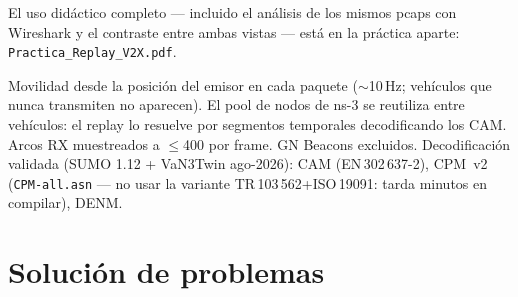 \documentclass[11pt,a4paper]{article}
\begin{document}
\begin{notabox}
El uso didáctico completo --- incluido el análisis de los mismos pcaps con
Wireshark y el contraste entre ambas vistas --- está en la práctica aparte:
\texttt{Practica\_Replay\_V2X.pdf}.
\end{notabox}

\begin{notabox}
Movilidad desde la posición del emisor en cada paquete ($\sim$10\,Hz;
vehículos que nunca transmiten no aparecen). El pool de nodos de ns-3 se
reutiliza entre vehículos: el replay lo resuelve por segmentos temporales
decodificando los CAM. Arcos RX muestreados a $\leq$400 por frame. GN Beacons
excluidos. Decodificación validada (SUMO 1.12 + VaN3Twin ago-2026): CAM
(EN\,302\,637-2), CPM~v2 (\texttt{CPM-all.asn} --- no usar la variante
TR\,103\,562+ISO\,19091: tarda minutos en compilar), DENM.
\end{notabox}

\section{Solución de problemas}
\end{document}
